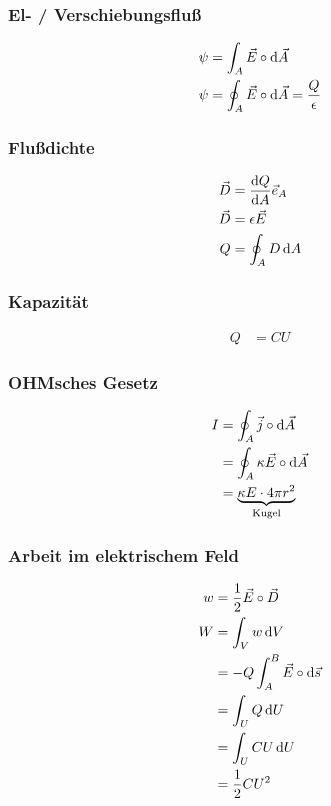 \newpage
\begin{multicols}{2}{}
\subsubsection{El- / Verschiebungsfluß}
\begin{align*}
\psi&=\int_A\vec{E}\circ\mathop{}\!\mathrm{d}\vec{A}\\
\psi&=\oint_A\vec{E}\circ\mathop{}\!\mathrm{d}\vec{A}=\frac{Q}{\epsilon}\\
\end{align*}

\subsubsection{Flußdichte}
\begin{align*}
\vec{D}&=\frac{\mathop{}\!\mathrm{d} Q}{\mathop{}\!\mathrm{d} A}\vec{e}_A\\
\vec{D}&=\epsilon\vec{E}\\
Q&=\oint_AD\mathop{}\!\mathrm{d} A
\end{align*}
\end{multicols}

\subsubsection{Kapazität}
\begin{align*}
Q&=CU
\end{align*}

\begin{multicols}{2}{}
\subsubsection{OHMsches Gesetz}
\begin{align*}
I &=\oint_A\vec{j}\circ\mathop{}\!\mathrm{d}\vec{A}\\
  &=\oint_A \kappa\vec{E}\circ\mathop{}\!\mathrm{d}\vec{A}\\
  &=\underbrace{\kappa E\cdot 4\pi r^2}_{\text{Kugel}}
\end{align*}
\vspace{20mm}

\subsubsection{Arbeit im elektrischem Feld}
\begin{align*}
w&=\frac{1}{2}\vec{E}\circ\vec{D}\\
W&=\int_Vw\mathop{}\!\mathrm{d} V\\
 &=-Q\int_A^B\vec{E}\circ\mathop{}\!\mathrm{d}\vec{s}\\
 &=\int_U Q\mathop{}\!\mathrm{d} U\\
 &= \int_U CU \mathop{}\!\mathrm{d} U\\
 &=\frac{1}{2}CU^2
\end{align*}
\end{multicols}
